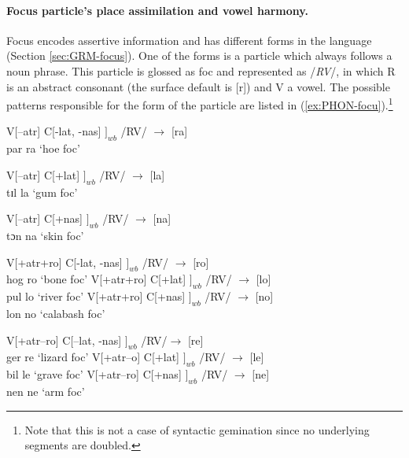 \paragraph{Focus particle's place assimilation and vowel harmony.}
\label{sec:focus-forms}

Focus encodes assertive information and has different forms in the language 
(Section \ref{sec:GRM-focus}). One of the forms is a   particle which 
always follows a noun phrase. This particle is glossed as {\sc foc} and  represented as /{\it RV}/, in which R is an abstract consonant (the surface default is [{r}]) and V a vowel. The possible patterns responsible for the form of the  particle are listed in (\ref{ex:PHON-focu}).\footnote{Note that this 
is not a case of syntactic gemination since no underlying segments are doubled.}

\begin{exe}
\ex\label{ex:PHON-focu} 
\begin{xlist}
\ex\label{ex:focus-ra} 
{\rm V[{\sc --atr}]  C[{\sc -lat}, {\sc -nas}]  $]_{wb}$ /RV/   $\rightarrow$ [ra] }\\ 
{\sls par ra} {\rm  `hoe {\sc foc}'}

\ex\label{ex:1} 
{\rm  V[{\sc --atr}]  C[{\sc +lat}]   $]_{wb}$ /RV/   $\rightarrow$ [la]} \\
{\sls tɪl la} {\rm  `gum {\sc foc}'}

\ex\label{ex:2}
{\rm V[{\sc --atr}] C[{\sc +nas}]   $]_{wb}$  /RV/   $\rightarrow$ [na]}\\
 {\sls tɔn na}   {\rm `skin {\sc foc}'}

\ex\label{ex:3} 
{\rm V[{\sc +atr}{\sc +ro}]  C[{\sc -lat}, {\sc -nas}] $]_{wb}$  /RV/  $\rightarrow$ [ro]} \\
 {\sls hog ro}   {\rm `bone {\sc foc}'}
\ex\label{ex:4} 
{\rm  V[{\sc +atr}{\sc +ro}]  C[{\sc +lat}] $]_{wb}$  /RV/   $\rightarrow$ [lo]} \\
 {\sls pul lo}   {\rm `river {\sc foc}'}
\ex\label{ex:5}
 {\rm V[{\sc +atr}{\sc +ro}]  C[{\sc +nas}] $]_{wb}$ /RV/   $\rightarrow$ [no]}\\
 {\sls lon no}   {\rm `calabash {\sc foc}'}

\ex\label{ex:6} 
{\rm  V[{\sc +atr}{\sc --ro}]  C[{\sc --lat}, {\sc -nas}] $]_{wb}$  /RV/$\rightarrow$ [re]} \\
 {\sls ger re}   {\rm `lizard {\sc foc}'}
\ex\label{ex:7} 
{\rm  V[{\sc +atr}{\sc --o}] C[{\sc +lat}]  $]_{wb}$  /RV/   $\rightarrow$ [le] }\\
 {\sls bil le}   {\rm `grave {\sc foc}'}
\ex\label{ex:8}
 {\rm V[{\sc +atr}{\sc --ro}] C[{\sc +nas}]   $]_{wb}$  /RV/   $\rightarrow$ [ne]} \\
 {\sls nen ne}   {\rm `arm {\sc foc}'}


\end{xlist}

\end{exe}


